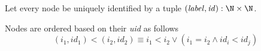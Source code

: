 \documentclass[english, aspectratio=169]{beamer}
\begin{document}
\begin{frame}[fragile]
  
\end{frame}

\blankframe

\begin{frame}
  Let every node be uniquely identified by a tuple $(\mathit{label},
  \mathit{id}) : \N \times \N$.

  \begin{center}
    \begin{tikzpicture}[scale=0.9, every node/.style={transform shape}]
      
    \end{tikzpicture}
  \end{center}
  Nodes are ordered based on their \emph{uid} as follows
  \begin{equation*}
    \label{eq:ordering}
    (i_1, \mathit{id}_1) < (i_2, \mathit{id}_2)
    \equiv
    i_1 < i_2 \vee (i_1 = i_2 \wedge \mathit{id}_i < \mathit{id}_j)
  \end{equation*}
\end{frame}
\end{document}
